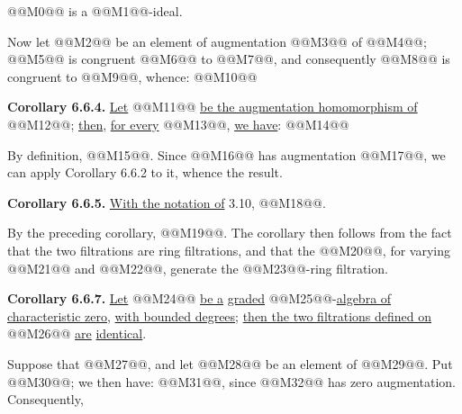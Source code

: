 @@M0@@ is a @@M1@@-ideal.

Now let @@M2@@ be an element of augmentation @@M3@@ of @@M4@@; @@M5@@ is congruent @@M6@@ to @@M7@@, and consequently @@M8@@ is congruent to @@M9@@, whence:
@@M10@@

\textbf{Corollary 6.6.4.} \uline{Let} @@M11@@ \uline{be the augmentation homomorphism of} @@M12@@; \uline{then}, \uline{for every} @@M13@@, \uline{we have}:
@@M14@@

By definition, @@M15@@. Since @@M16@@ has augmentation @@M17@@, we can apply Corollary 6.6.2 to it, whence the result.

\textbf{Corollary 6.6.5.} \uline{With the notation of} 3.10, @@M18@@.

By the preceding corollary, @@M19@@. The corollary then follows from the fact that the two filtrations are ring filtrations, and that the @@M20@@, for varying @@M21@@ and @@M22@@, generate the @@M23@@-ring filtration.

\textbf{Corollary 6.6.7.} \uline{Let} @@M24@@ \uline{be a} \uline{graded} @@M25@@-\uline{algebra of characteristic zero}, \uline{with bounded degrees}; \uline{then the two filtrations defined on} @@M26@@ \uline{are} \uline{identical}.

Suppose that @@M27@@, and let @@M28@@ be an element of @@M29@@. Put @@M30@@; we then have:
@@M31@@, since @@M32@@ has zero augmentation. Consequently,
